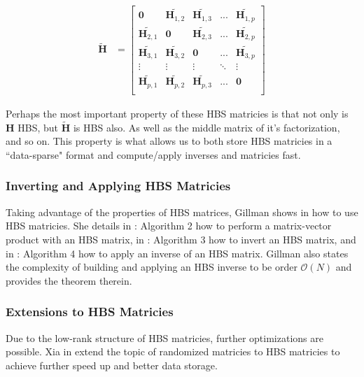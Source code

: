 \begin{align}
    \tilde{\textbf{H}} &=
    \begin{bmatrix}
        \textbf{0}       & \tilde{\textbf{H}_{1,2}} & \tilde{\textbf{H}_{1,3}} & ...    & \tilde{\textbf{H}_{1,p}} \\
        \tilde{\textbf{H}_{2,1}} & \textbf{0}       & \tilde{\textbf{H}_{2,3}} & ...    & \tilde{\textbf{H}_{2,p}} \\
        \tilde{\textbf{H}_{3,1}} & \tilde{\textbf{H}_{3,2}} & \textbf{0}       & ...    & \tilde{\textbf{H}_{3,p}} \\
        \vdots           & \vdots           & \vdots           & \ddots & \vdots           \\
        \tilde{\textbf{H}_{p,1}} & \tilde{\textbf{H}_{p,2}} & \tilde{\textbf{H}_{p,3}} & ...    & \textbf{0}       \\
    \end{bmatrix}
\end{align}

Perhaps the most important property of these HBS matricies is that not only is $\textbf{H}$ HBS, but $\tilde{\textbf{H}}$ is HBS also. As well as the middle matrix of it's factorization, and so on. This property is what allows us to both store HBS matricies in a ``data-sparse" format and compute/apply inverses and matricies fast.

\subsubsection{Inverting and Applying HBS Matricies}
\label{subsub:applyHBS}

Taking advantage of the properties of HBS matrices, Gillman shows in \citep{gillman2012direct} how to use HBS matricies. She details in \citep{gillman2012direct}: Algorithm 2 how to perform a matrix-vector product with an HBS matrix, in \citep{gillman2012direct}: Algorithm 3 how to invert an HBS matrix, and in \citep{gillman2012direct}: Algorithm 4 how to apply an inverse of an HBS matrix. Gillman also states the complexity of building and applying an HBS inverse to be order $\mathcal{O}(N)$ and provides the theorem therein.

\subsubsection{Extensions to HBS Matricies}

Due to the low-rank structure of HBS matricies, further optimizations are possible. Xia in \citep{xia2013randomized} extend the topic of randomized matricies to HBS matricies to achieve further speed up and better data storage.

